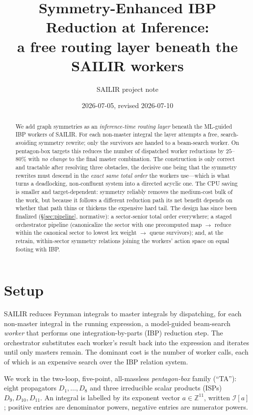 \documentclass[11pt]{article}
\title{\bf Symmetry-Enhanced IBP Reduction at Inference:\\
a free routing layer beneath the SAILIR workers}
\author{SAILIR project note}
\date{2026-07-05, revised 2026-07-10}
\newcommand{\I}[1]{\mathcal{I}[#1]}
\begin{document}
\maketitle

\begin{abstract}
We add graph symmetries as an \emph{inference-time routing layer} beneath the
ML-guided IBP workers of SAILIR. For each non-master integral the layer attempts a
free, search-avoiding symmetry rewrite; only the survivors are handed to a beam-search
worker. On pentagon-box targets this reduces the number of dispatched worker
reductions by $25$--$80\%$ with \emph{no change} to the final master combination.
The construction is only correct and tractable after resolving three obstacles, the
decisive one being that the symmetry rewrites must descend in the \emph{exact same
total order} the workers use---which is what turns a deadlocking, non-confluent
system into a directed acyclic one. The CPU saving is smaller and target-dependent:
symmetry reliably removes the medium-cost bulk of the work, but because it follows a
different reduction path its net benefit depends on whether that path thins or
thickens the expensive hard tail. The design has since been finalized
(\S\ref{sec:pipeline}, normative): a sector-senior total order everywhere; a staged
orchestrator pipeline (canonicalize the sector with one precomputed map $\to$ reduce
within the canonical sector to lowest lex weight $\to$ queue survivors); and, at the
retrain, within-sector symmetry relations joining the workers' action space on equal
footing with IBP.
\end{abstract}

\section{Setup}
SAILIR reduces Feynman integrals to master integrals by dispatching, for each
non-master integral in the running expression, a model-guided beam-search
\emph{worker} that performs one integration-by-parts (IBP) reduction step. The
orchestrator substitutes each worker's result back into the expression and iterates
until only masters remain. The dominant cost is the number of worker calls, each of
which is an expensive search over the IBP relation system.

We work in the two-loop, five-point, all-massless \emph{pentagon-box} family
(``TA''): eight propagators $D_1,\dots,D_8$ and three irreducible scalar products
(ISPs) $D_9,D_{10},D_{11}$. An integral is labelled by its exponent vector
$a\in\mathbb{Z}^{11}$, written $\I{a}$; positive entries are denominator powers,
negative entries are numerator powers.
\end{document}
